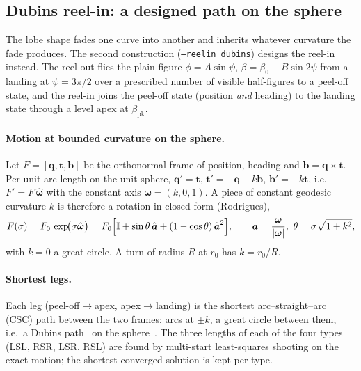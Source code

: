 \documentclass[11pt,a4paper]{article}
\newcommand{\code}[1]{\texttt{\small #1}}
\newcommand{\vect}[1]{\boldsymbol{#1}}
\begin{document}
\subsection{Dubins reel-in: a designed path on the sphere}
\label{sec:dubins}

The lobe shape fades one curve into another and inherits whatever curvature
the fade produces. The second construction (\code{--reelin dubins}) designs
the reel-in instead. The reel-out flies the plain figure
$\phi=A\sin\psi$, $\beta=\beta_0+B\sin2\psi$ from a landing at
$\psi=3\pi/2$ over a prescribed number of visible half-figures to a peel-off
state, and the reel-in joins the peel-off state (position \emph{and}
heading) to the landing state through a level apex at $\beta_\mathrm{pk}$.

\paragraph{Motion at bounded curvature on the sphere.}
Let $F=[\vect q,\vect t,\vect b]$ be the orthonormal frame of position,
heading and $\vect b=\vect q\times\vect t$. Per unit arc length on the unit
sphere, $\vect q'=\vect t$, $\vect t'=-\vect q+k\vect b$, $\vect b'=-k\vect t$,
i.e.\ $F' = F\,\hat{\vect\omega}$ with the constant axis $\vect\omega=(k,0,1)$.
A piece of constant geodesic curvature $k$ is therefore a rotation in closed
form (Rodrigues),
\begin{equation}
  F(\sigma) = F_0\,\exp\!\bigl(\sigma\hat{\vect\omega}\bigr)
  = F_0\Bigl[\mathbb I + \sin\theta\,\hat{\vect a} + (1-\cos\theta)\,\hat{\vect a}^2\Bigr],
  \qquad \vect a = \frac{\vect\omega}{|\vect\omega|},\ \theta=\sigma\sqrt{1+k^2},
\end{equation}
with $k=0$ a great circle. A turn of radius $R$ at $r_0$ has $k=r_0/R$.

\paragraph{Shortest legs.}
Each leg (peel-off$\to$apex, apex$\to$landing) is the shortest
arc--straight--arc (CSC) path between the two frames: arcs at $\pm k$, a
great circle between them, i.e.\ a Dubins path~\cite{dubins1957} on the
sphere~\cite{monroy1998}. The three lengths of each of the four types (LSL,
RSR, LSR, RSL) are found by multi-start least-squares shooting on the exact
motion; the shortest converged solution is kept per type.
\end{document}
